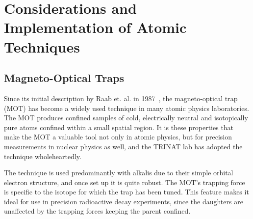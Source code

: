 %
%
%
\clearpage
\chapter{Considerations and Implementation of Atomic Techniques}
\label{atomicphysics_chapter}


\section{Magneto-Optical Traps}
Since its initial description by Raab et. al. in 1987~\cite{raabprentiss}, the magneto-optical trap (MOT) has become a widely used technique in many atomic physics laboratories.  The MOT produces confined samples of cold, electrically neutral and isotopically pure atoms confined within a small spatial region.  It is these properties that make the MOT a valuable tool not only in atomic physics, but for precision measurements in nuclear physics as well, and the TRINAT lab  has adopted the technique wholeheartedly.

The technique is used predominantly with alkalis due to their simple orbital electron structure,%
and once set up it is quite robust.  The MOT's trapping force is specific to the isotope for which the trap has been tuned. This feature makes it ideal for use in precision radioactive decay experiments, since the daughters are unaffected by the trapping forces keeping the parent confined.

